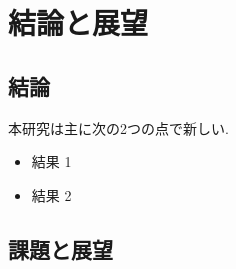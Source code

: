 \documentclass[thesis]{subfiles}
\begin{document}
\chapter{結論と展望}

\section{結論}
本研究は主に次の2つの点で新しい.
\begin{itemize}
	\item 結果 1
	\item 結果 2
\end{itemize}

\section{課題と展望}
\end{document}
